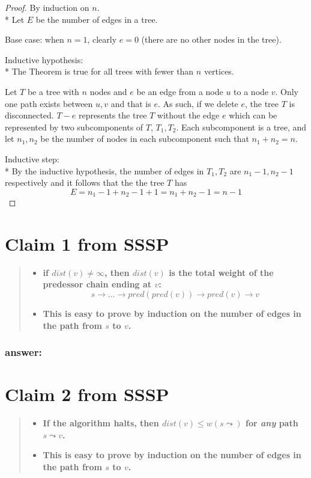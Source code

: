 \documentclass[titlepage]{article}\usepackage[]{graphicx}\usepackage[]{color}
\begin{document}
\begin{proof}
By induction on $n$. \\*
Let $E$ be the number of edges in a tree.

Base case: when $n =1$, clearly $e = 0$ (there are no other nodes in the tree).

Inductive hypothesis: \\*
The Theorem is true for all trees with fewer than $ n$ vertices.

Let $T$ be a tree with $n$ nodes and $e$ be an edge from a node $u$ to a node
$v$. Only one path exists between $u,v$ and that is $e$. As such, if we delete $e$, the
tree $T$ is disconnected. $T - e$ represents the tree $T$ without the edge $e$
which can be represented by two subcomponents of $T$, $T_1, T_2$. Each
subcomponent is a tree, and let $n_1,n_2$ be the number of nodes in each
subcomponent such that $n_1 + n_2 = n$. 

Inductive step: \\*
By the inductive hypothesis, the number of edges in $T_1, T_2$ are $n_1-1,
n_2-1$
respectively and it follows that the the tree $T$ has 
\[ E = n_1 -1 + n_2 -1 +1 = n_1 + n_2-1 = n-1 \]
  \qedhere
\end{proof}


\section{Claim 1 from SSSP}
\begin{quote}
\begin{itemize}
  \item \textbf{if $dist(v) \neq \infty $, then $dist(v)$ is the total weight
	of the predessor chain ending at $v$:
  \[ s \rightarrow \dots \rightarrow pred(pred(v)) \rightarrow pred(v) \rightarrow v \] }
  \item \textbf{This is easy to prove by induction on the number of edges in
	the path from $s$ to $v$.}
\end{itemize}
\end{quote}

\subsubsection{answer:}
\vspace{8cm}




\section{Claim 2 from SSSP}
\begin{quote}
\begin{itemize}
  \item \textbf{ If the algorithm halts, then $dist(v) \leq w(s \leadsto )$
	  for \emph{any} path $s \leadsto v$.}
  \item \textbf{This is easy to prove by induction on the number of edges in
	the path from $s$ to $v$.}
\end{itemize}
\end{quote}
\end{document}
